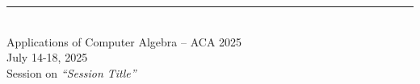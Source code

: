 \documentclass{article}
\newcommand{\HEADING}{
{\noindent \small Applications of Computer Algebra -- ACA 2025 \\
\small July 14-18, 2025\\
Session on \textit{``Session Title''}}
\vspace{10pt}}
\begin{document}
	
\rule{\textwidth}{0.01 in}\\[-2em]
	
\HEADING	

\vspace{1cm}




\end{document}
